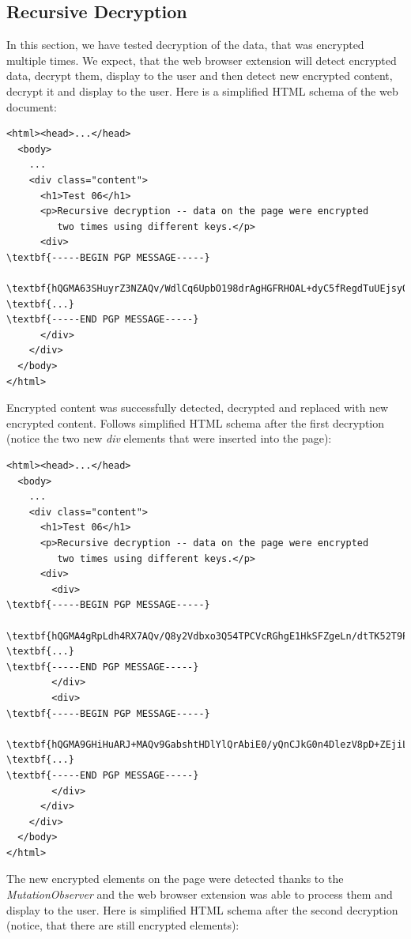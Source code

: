 \subsection{Recursive Decryption}
\label{test:recursive}
In this section, we have tested decryption of the data, that was encrypted multiple times. We expect, that the web browser extension will detect encrypted data, decrypt them, display to the user and then detect new encrypted content, decrypt it and display to the user. Here is a simplified HTML schema of the web document:

\begin{Verbatim}[commandchars=\\\{\},codes={\catcode`$=3\catcode`_=8},samepage=false,frame=single]
<html><head>...</head>
  <body>
    ...
    <div class="content">
      <h1>Test 06</h1>
      <p>Recursive decryption -- data on the page were encrypted
         two times using different keys.</p>
      <div>
\textbf{-----BEGIN PGP MESSAGE-----}

\textbf{hQGMA63SHuyrZ3NZAQv/WdlCq6UpbO198drAgHGFRHOAL+dyC5fRegdTuUEjsyQf}
\textbf{...}
\textbf{-----END PGP MESSAGE-----}
      </div>
    </div>
  </body>
</html>
\end{Verbatim}

Encrypted content was successfully detected, decrypted and replaced with new encrypted content. Follows simplified HTML schema after the first decryption (notice the two new \textit{div} elements that were inserted into the page):

\begin{Verbatim}[commandchars=\\\{\},codes={\catcode`$=3\catcode`_=8},samepage=false,frame=single]
<html><head>...</head>
  <body>
    ...
    <div class="content">
      <h1>Test 06</h1>
      <p>Recursive decryption -- data on the page were encrypted
         two times using different keys.</p>
      <div>
        <div>
\textbf{-----BEGIN PGP MESSAGE-----}

\textbf{hQGMA4gRpLdh4RX7AQv/Q8y2Vdbxo3Q54TPCVcRGhgE1HkSFZgeLn/dtTK52T9Pk}
\textbf{...}
\textbf{-----END PGP MESSAGE-----}
        </div>
        <div>
\textbf{-----BEGIN PGP MESSAGE-----}

\textbf{hQGMA9GHiHuARJ+MAQv9GabshtHDlYlQrAbiE0/yQnCJkG0n4DlezV8pD+ZEjiLE}
\textbf{...}
\textbf{-----END PGP MESSAGE-----}
        </div>
      </div>
    </div>
  </body>
</html>
\end{Verbatim}

The new encrypted elements on the page were detected thanks to the \textit{MutationObserver} and the web browser extension was able to process them and display to the user. Here is simplified HTML schema after the second decryption (notice, that there are still encrypted elements):

